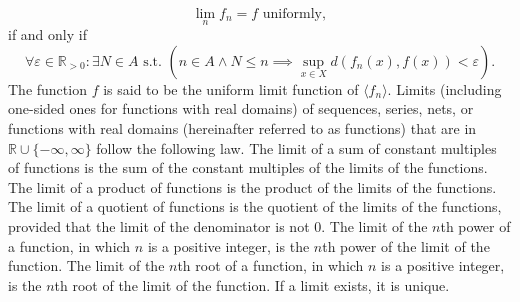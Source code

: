 \documentclass[a4paper,12pt]{report}
\begin{document}
\[\lim_nf_n=f\text{\ uniformly},\]
if and only if
\[\forall\varepsilon\in\mathbb{R}_{>0}\colon\exists N\in A\text{\ s.t.\ }\left(n\in A\land N\leq n\implies\sup_{x\in X}d(f_n(x),f(x))<\varepsilon\right).\]
The function $f$ is said to be the uniform limit function of $\langle f_n\rangle$.
Limits (including one-sided ones for functions with real domains) of sequences, series, nets, or functions with real domains (hereinafter referred to as functions) that are in $\mathbb{R}\cup\{-\infty,\infty\}$ follow the following law.
The limit of a sum of constant multiples of functions is the sum of the constant multiples of the limits of the functions.
The limit of a product of functions is the product of the limits of the functions.
The limit of a quotient of functions is the quotient of the limits of the functions, provided that the limit of the denominator is not 0.
The limit of the $n$th power of a function, in which $n$ is a positive integer, is the $n$th power of the limit of the function.
The limit of the $n$th root of a function, in which $n$ is a positive integer, is the $n$th root of the limit of the function.
If a limit exists, it is unique.
\end{document}
